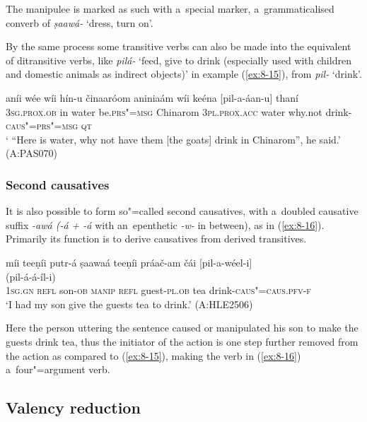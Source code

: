 The manipulee is marked as such with a~special marker, a~grammaticalised converb of \textit{ṣaawá-} `dress, turn on'. 


By the same process some transitive verbs can also be made into the equivalent of ditransitive verbs, like \textit{pilá-} `feed, give to drink (especially used with children and domestic animals as indirect objects)' in example (\ref{ex:8-15}), from \textit{pil-} `drink'. 

\begin{exe}
\ex
\label{ex:8-15}
\gll aníi wée wíi hín-u činaaróom aniniaám wíi keéna [pil-a-áan-u] thaní  \\
\textsc{3sg.prox.ob} in water be.\textsc{prs"=msg} Chinarom \textsc{3pl.prox.acc} water why.not drink-\textsc{caus"=prs"=msg} \textsc{qt} \\
\glt ` ``Here is water, why not have them [the goats] drink in Chinarom'', he said.' (A:PAS070)
\end{exe}

\subsubsection*{Second causatives}

It is also possible to form so"=called second causatives, with a~doubled causative suffix \textit{-awá (-á + -á} with an~epenthetic \textit{-w-} in between), as in (\ref{ex:8-16}). Primarily its function is to derive causatives from derived transitives.

\begin{exe}
\ex
\label{ex:8-16}
\glll míi teeṇíi putr-á ṣaawaá teeṇíi práač-am čái
     [pil-a-wéel-i]\\
	{} {} {} {} {} {} {}  (pil-á-á-íl-i)\\
\textsc{1sg.gn} \textsc{refl} son-\textsc{ob} \textsc{manip} \textsc{refl} guest-\textsc{pl.ob} tea drink-\textsc{caus"=caus.pfv-f}\\
\glt `I had my son give the guests tea to drink.' (A:HLE2506)
\end{exe}

Here the person uttering the sentence caused or manipulated his son to make the guests drink tea, thus the initiator of the action is one step further removed from the action as compared to (\ref{ex:8-15}), making the verb in (\ref{ex:8-16}) a~four"=argument verb. 


\subsection{Valency reduction}
\label{subsec:8-5-2}

